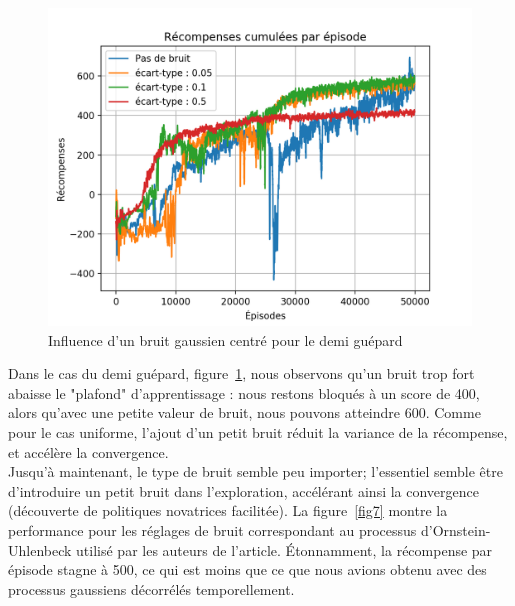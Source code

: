 \documentclass[letterpaper, french]{article}
\begin{document}
\begin{figure}
\begin{center}
\includegraphics[scale=0.5]{assiettes/halfCheetah_normal.png}
\caption{Influence d'un bruit gaussien centré pour le demi guépard}
\label{fig6}
\end{center}
\end{figure}
Dans le cas du demi guépard, figure~\ref{fig6}, nous observons qu'un bruit trop fort abaisse le "plafond" d'apprentissage : nous restons bloqués à un score de 400, alors qu'avec une petite valeur de bruit, nous pouvons atteindre 600. Comme pour le cas uniforme, l'ajout d'un petit bruit réduit la variance de la récompense, et accélère la convergence.
\\
Jusqu'à maintenant, le type de bruit semble peu importer; l'essentiel semble être d'introduire un petit bruit dans l'exploration, accélérant ainsi la convergence (découverte de politiques novatrices facilitée).
\smallbreak
La figure~\ref{fig7} montre la performance pour les réglages de bruit correspondant au processus d'Ornstein-Uhlenbeck utilisé par les auteurs de l'article. Étonnamment, la récompense par épisode stagne à 500, ce qui est moins que ce que nous avions obtenu avec des processus gaussiens décorrélés temporellement.
\end{document}
